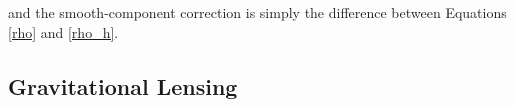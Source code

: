\documentclass[%
 reprint,
 amsmath,amssymb,
 aps,nofootinbib
]{revtex4-1}
\begin{document}
\noindent and the smooth-component correction is simply the difference between Equations \eqref{rho} and \eqref{rho_h}.


\subsection{Gravitational Lensing} \label{grav_lensing}
\end{document}
